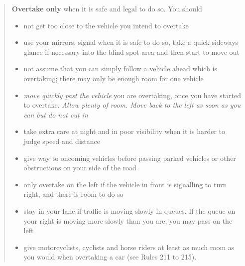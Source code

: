\begin{quote}
    \textbf{Overtake only} when it is safe and legal to do so. You should
    \begin{itemize}
        \item not get too close to the vehicle you intend to overtake
        \item use your mirrors, signal when it is safe to do so, take a quick sideways glance if necessary into the blind spot area and then start to move out
        \item not assume that you can simply follow a vehicle ahead which is overtaking; there may only be enough room for one vehicle
        \item \emph{move quickly past the vehicle} you are overtaking, once you have started to overtake. \emph{Allow plenty of room. Move back to the left as soon as you can but do not cut in}
        \item take extra care at night and in poor visibility when it is harder to judge speed and distance
        \item give way to oncoming vehicles before passing parked vehicles or other obstructions on your side of the road
        \item only overtake on the left if the vehicle in front is signalling to turn right, and there is room to do so
        \item stay in your lane if traffic is moving slowly in queues. If the queue on your right is moving more slowly than you are, you may pass on the left
        \item give motorcyclists, cyclists and horse riders at least as much room as you would when overtaking a car (see Rules 211 to 215).
    \end{itemize}
\end{quote}

